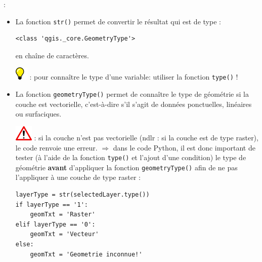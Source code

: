 \documentclass[11pt]{article}
\begin{document}
\begin{enumerate}
\underline{}: 
\vspace*{0.4em}
\begin{itemize}\itemsep0.2em
\renewcommand\labelitemi{\---}
\item La fonction \og{}\texttt{str()}\fg{} permet de convertir le résultat qui est de type :
\vspace*{-0.2em}
\begin{center}
\begin{minipage}[t]{0.40\textwidth}
\begin{verbatim}
<class 'qgis._core.GeometryType'>
\end{verbatim}
\end{minipage}
\end{center}
\vspace*{1em}

en chaîne de caractères. \vspace*{0.2em}

\includegraphics[scale=1]{tip_l.png} \underline{}: pour connaître le type d'une variable: utiliser la fonction  \og{}\texttt{type()}\fg{} !






\newpage{}
\item La fonction \og{}\texttt{geometryType()}\fg{} permet de connaître le type de géométrie si la couche est vectorielle, c'est-à-dire s'il s'agit de données ponctuelles, linéaires ou surfaciques.

\includegraphics[scale=1]{warningt.png} \underline{}: si la couche n'est pas vectorielle (ndlr : si la couche est de type raster), le code renvoie une erreur. $\Rightarrow$ dans le code Python, il est donc important de tester (à l'aide de la fonction \og{}\texttt{type()}\fg{} et l'ajout d'une condition) le type de géométrie \textbf{avant} d'appliquer la fonction \og{}\texttt{geometryType()}\fg{} afin de ne pas l'appliquer à une couche de type raster : 
\vspace*{-0.2em}
\begin{center}
\begin{minipage}[t]{0.44\textwidth}
\begin{verbatim}
layerType = str(selectedLayer.type())
if layerType == '1':
    geomTxt = 'Raster'
elif layerType == '0':
    geomTxt = 'Vecteur'
else:
    geomTxt = 'Geometrie inconnue!'
\end{verbatim}
\end{minipage}
\end{center}
\vspace*{1em}
\end{itemize}



\end{enumerate}
\end{document}
